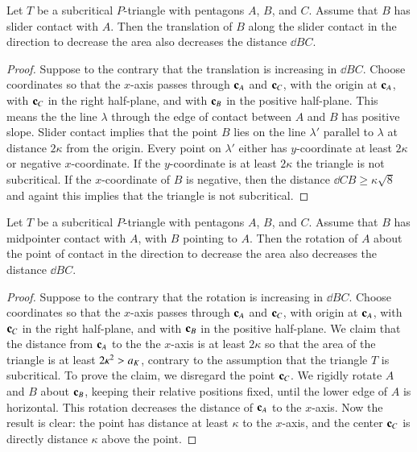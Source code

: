 \begin{lemma}  Let $T$ be a subcritical $P$-triangle with pentagons $A$, $B$, and $C$.  Assume that $B$ has slider
contact with $A$.  Then the translation of $B$ along the slider contact in the direction to decrease the area also decreases
the distance $\dd{B}{C}$.
\end{lemma}

\begin{proof} Suppose to the contrary that the translation is increasing in $\dd{B}{C}$.  Choose coordinates so that the $x$-axis
passes through ${\mathbf c}_A$ and ${\mathbf c}_C$, with the origin at ${\mathbf c}_A$, with  ${\mathbf c}_C$ in the right half-plane, and with ${\mathbf c}_B$ in the positive half-plane.
This means the the line $\lambda$ through the edge
of contact between $A$ and $B$ has positive slope.  Slider contact implies that 
the point $B$ lies on the line $\lambda'$ parallel to $\lambda$ at distance $2\kappa$ from the origin.
Every point on $\lambda'$ either has $y$-coordinate at least $2\kappa$ or negative $x$-coordinate.  If the $y$-coordinate
is at least $2\kappa$ the triangle is not subcritical.  If the $x$-coordinate of $B$ is negative, then the distance $\dd{C}{B} \ge\kappa\sqrt8$
and againt this implies that the triangle is not subcritical.
\end{proof}

\begin{lemma}  Let $T$ be a subcritical $P$-triangle with pentagons $A$, $B$, and $C$.  Assume that $B$ has midpointer
contact with $A$, with $B$ pointing to $A$.  Then the rotation of $A$ about the point of contact in the direction to decrease the area also decreases
the distance $\dd{B}{C}$.
\end{lemma}



\begin{proof} Suppose to the contrary that the rotation is increasing in $\dd{B}{C}$.  Choose coordinates so that the $x$-axis passes
through ${\mathbf c}_A$ and ${\mathbf c}_C$, with origin at ${\mathbf c}_A$, with ${\mathbf c}_C$ in the right half-plane, and with ${\mathbf c}_B$ in the positive half-plane.
We claim that the distance from ${\mathbf c}_A$ to the the $x$-axis is at least $2\kappa$ so that the area of the triangle is at least $2\kappa^2 > a_K$,
contrary to the assumption that the triangle $T$ is subcritical.   To prove the claim, we disregard the point ${\mathbf c}_C$.  We rigidly rotate
$A$ and $B$ about ${\mathbf c}_B$, keeping their relative positions fixed, until the lower edge of $A$ is horizontal.  This rotation decreases the
distance of ${\mathbf c}_A$ to the $x$-axis.  Now the result is clear: the point has distance at least $\kappa$ to the $x$-axis, and the center ${\mathbf c}_C$ is
directly distance $\kappa$ above the point.
\end{proof}

